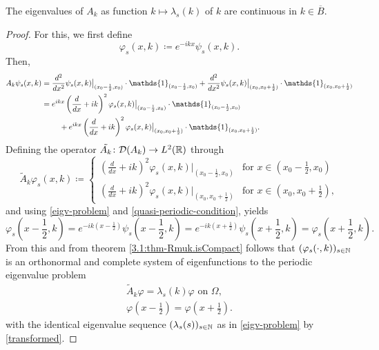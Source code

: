 \begin{theorem}
	The eigenvalues of $A_{k}$ as function $k \mapsto \lambda_{s}(k)$ of $k$ are continuous in $k \in \overline{B}$.

	\begin{proof}
		For this, we first define
			\[ \varphi_{s}(x, k) \coloneqq e^{-ikx} \psi_{s}(x, k). \]
		Then,
		\begin{align}
			A_{k} \psi_{s}(x, k) & = \frac{d^{2}}{dx^{2}} \psi_{s}(x, k)\big|_{(x_{0} - \frac{1}{2}, x_{0})} \cdot \mathds{1}_{(x_{0} - \frac{1}{2}, x_{0})} + \frac{d^{2}}{dx^{2}} \psi_{s}(x, k)\big|_{(x_{0}, x_{0}  + \frac{1}{2})} \cdot \mathds{1}_{(x_{0}, x_{0} + \frac{1}{2})} \notag \\
				& = e^{ikx} \left( \frac{d}{dx} + ik \right)^{2} \varphi_{s}(x, k)\big|_{(x_{0} - \frac{1}{2}, x_{0})} \cdot \mathds{1}_{(x_{0} - \frac{1}{2}, x_{0})} \notag \\
				& ~\qquad + e^{ikx} \left( \frac{d}{dx} + ik \right)^{2} \varphi_{s}(x, k)\big|_{(x_{0}, x_{0}  + \frac{1}{2})} \cdot \mathds{1}_{(x_{0}, x_{0} + \frac{1}{2})}. \label{transformed}
		\end{align}
		Defining the operator $\tilde{A_{k}} \colon \mathcal{D}(A_{k}) \rightarrow L^{2}(\mathbb{R})$ through 
			\[ \tilde{A}_{k} \varphi_{s}(x, k) \coloneqq \begin{cases}
 				\left( \frac{d}{dx} + ik \right)^{2} \varphi_{s}(x, k)|_{(x_{0} - \frac{1}{2}, x_{0})} & \text{for } x \in (x_{0} - \frac{1}{2}, x_{0}) \\ \left( \frac{d}{dx} + ik \right)^{2} \varphi_{s}(x, k)|_{(x_{0}, x_{0}  + \frac{1}{2})} & \text{for } x \in (x_{0}, x_{0} + \frac{1}{2}),
 			\end{cases} \] 
		and using \eqref{eigv-problem} and \eqref{quasi-periodic-condition}, yields
			\[ \varphi_{s}\left(x - \frac{1}{2}, k\right) = e^{-ik(x - \frac{1}{2})} \psi_{s}\left(x - \frac{1}{2}, k\right) = e^{-ik(x + \frac{1}{2})} \psi_{s}\left(x + \frac{1}{2}, k\right) = \varphi_{s}\left(x + \frac{1}{2}, k\right). \]
		From this and from theorem \ref{3.1:thm-Rmuk.isCompact} follows that $(\varphi_{s}(\cdot, k))_{s \in \mathbb{N}}$ is an orthonormal and complete system of eigenfunctions to the periodic eigenvalue problem
		\begin{align}
			\tilde{A}_{k} \varphi = \lambda_{s}(k) \varphi \text{ on } \Omega, \label{mod-eigv-problem} \\
		 	\varphi(x - \frac{1}{2}) = \varphi(x + \frac{1}{2}). \label{periodic-condition}
		\end{align}
		with the identical eigenvalue sequence $(\lambda_{s}(s))_{s \in \mathbb{N}}$ as in \eqref{eigv-problem} by \eqref{transformed}. %
	\end{proof}
\end{theorem}
